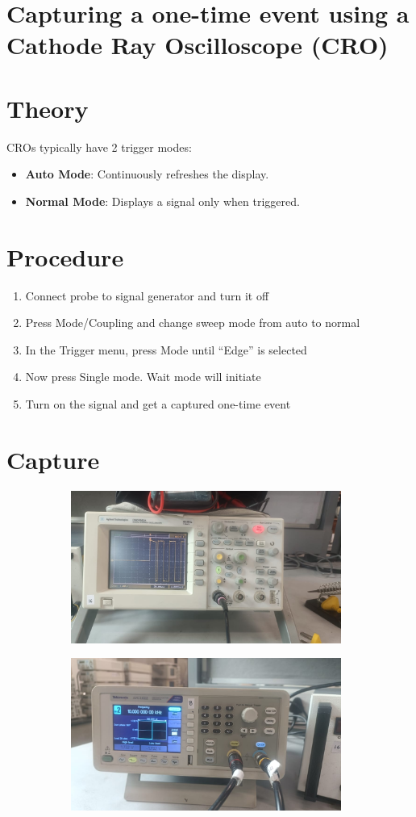 \documentclass[a4paper,12pt]{article}
\begin{document}
\section{Capturing a one-time event using a Cathode Ray Oscilloscope (CRO)}
\section*{Theory}
CROs typically have 2 trigger modes:
\begin{itemize}
    \item \textbf{Auto Mode}: Continuously refreshes the display.
    \item \textbf{Normal Mode}: Displays a signal only when triggered.
\end{itemize}
\section*{Procedure}
\begin{enumerate}
    \item Connect probe to signal generator and turn it off
    \item Press Mode/Coupling and change sweep mode from auto to normal
    \item In the Trigger menu, press Mode until “Edge” is selected
    \item Now press Single mode. Wait mode will initiate
    \item Turn on the signal and get a captured one-time event   
\end{enumerate}
\section*{Capture}
\begin{figure}[H]
    \centering
    \begin{subfigure}{0.5\textwidth}
        \centering
        \includegraphics[height=5cm]{figs/capture/plot.jpeg}
    \end{subfigure}%
    \begin{subfigure}{0.5\textwidth}
        \centering
        \includegraphics[height=5cm]{figs/capture/para.jpeg}
    \end{subfigure}
\end{figure}
\end{document}
